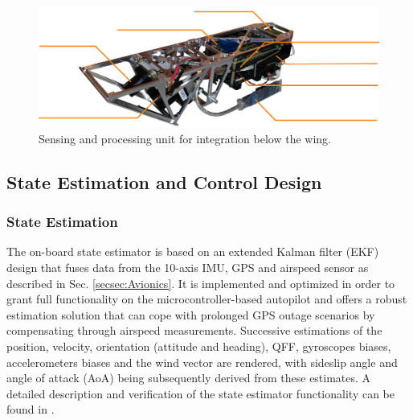 %  
\begin{figure}[tb]
    \centering
     \includegraphics[width=\linewidth]{images/pod}
    \caption[Modular sensing and processing unit.]{Sensing and processing unit for integration below the wing.}
    \label{f:03_sensor_pod}
\end{figure}

\subsection{State Estimation and Control Design}

\subsubsection{State Estimation} \label{secsec:StateEstimation}

The on-board state estimator is based on an extended Kalman filter (EKF) design that fuses data from the 10-axis IMU, GPS and airspeed sensor as described in Sec. \ref{secsec:Avionics}. It is implemented and optimized in order to grant full functionality on the microcontroller-based autopilot and offers a robust estimation solution that can cope with prolonged GPS outage scenarios by compensating through airspeed measurements. Successive estimations of the position, velocity, orientation (attitude and heading), QFF, gyroscopes biases, accelerometers biases and the wind vector are rendered, with sideslip angle and angle of attack (AoA) being subsequently derived from these estimates. A detailed description and verification of the state estimator functionality can be found in \cite{Leutenegger_MSC2014}.
  
